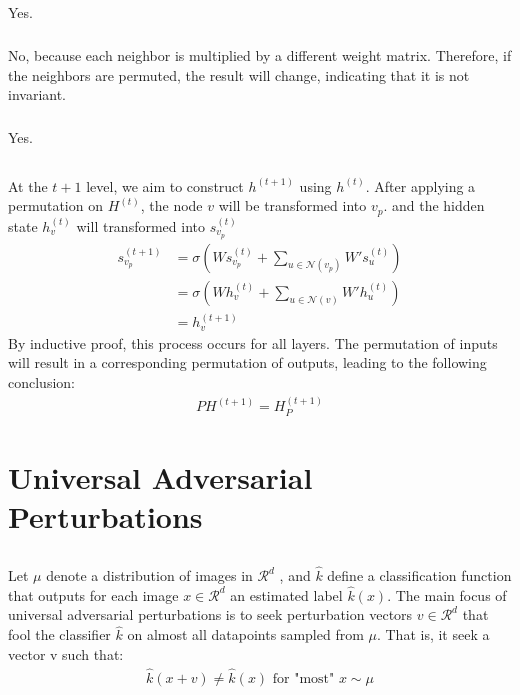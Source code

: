 \documentclass{article}
\begin{document}
\subsection{}


\subsubsection{}
Yes.


\subsubsection{}
No, because each neighbor is multiplied by a different weight matrix. 
Therefore, if the neighbors are permuted, the result will change,
indicating that it is not invariant.


\subsubsection{}
Yes.


\subsection{}
At the $t+1$ level, we aim to construct $h^{(t+1)}$ using $h^{(t)}$. After applying a permutation on $H^{(t)}$, the node $v$ will be transformed into $v_p$.
and the hidden state $h_v^{(t)}$ will transformed into $s_{v_p}^{(t)}$
\begin{align*}
    s_{v_p}^{(t+1)} 
    &= \sigma\left(Ws_{v_p}^{(t)} + \sum_{u \in \mathcal{N}(v_p)} W's_{u}^{(t)}\right) \\
    &= \sigma\left(Wh_{v}^{(t)} + \sum_{u \in \mathcal{N}(v)} W'h_{u}^{(t)}\right) \\
    &= h_{v}^{(t+1)}
\end{align*}
By inductive proof, this process occurs for all layers. The permutation of inputs will result
in a corresponding permutation of outputs, leading to the following conclusion:
\begin{align*}
   PH^{(t + 1)} = H_P^{(t + 1)}
\end{align*}



\section{Universal Adversarial Perturbations}


\subsection{}
Let $\mu$ denote a distribution of images in $\mathcal{R}^d$ , and
$\hat{k}$ define a classification function that outputs for each image 
$x \in \mathcal{R}^d$ an estimated label $\hat{k}(x)$. The main focus of universal 
adversarial perturbations is to seek perturbation vectors $v \in \mathcal{R}^d$ that fool the
classifier $\hat{k}$ on almost all datapoints sampled from $\mu$. That
is, it seek a vector v such that:
\begin{align*}
    \hat{k}(x + v) \neq \hat{k}(x) \text{ for "most" } x \sim \mu
\end{align*}
\end{document}
